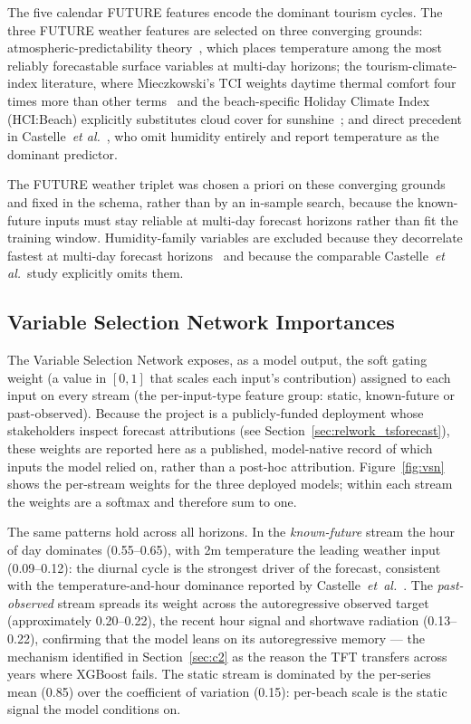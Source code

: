 \documentclass[twocolumn,twoside,a4paper,10pt]{IEEEtran}
\begin{document}
The five calendar FUTURE features encode the dominant tourism cycles. The three FUTURE weather features are selected on three converging grounds: atmospheric-predictability theory~\cite{Lorenz1963,ECMWF2024}, which places temperature among the most reliably forecastable surface variables at multi-day horizons; the tourism-climate-index literature, where Mieczkowski's TCI weights daytime thermal comfort four times more than other terms~\cite{Mieczkowski1985} and the beach-specific Holiday Climate Index (HCI:Beach) explicitly substitutes cloud cover for sunshine~\cite{ScottHCIBeach2016}; and direct precedent in Castelle~\emph{et al.}~\cite{Castelle2025}, who omit humidity entirely and report temperature as the dominant predictor.

The FUTURE weather triplet was chosen a priori on these converging grounds and fixed in the schema, rather than by an in-sample search, because the known-future inputs must stay reliable at multi-day forecast horizons rather than fit the training window. Humidity-family variables are excluded because they decorrelate fastest at multi-day forecast horizons~\cite{ECMWF2024} and because the comparable Castelle~\emph{et al.}\ study explicitly omits them.

\subsection{Variable Selection Network Importances}\label{sec:vsn}

The Variable Selection Network exposes, as a model output, the soft gating weight (a value in $[0,1]$ that scales each input's contribution) assigned to each input on every stream (the per-input-type feature group: static, known-future or past-observed). Because the project is a publicly-funded deployment whose stakeholders inspect forecast attributions (see Section~\ref{sec:relwork_tsforecast}), these weights are reported here as a published, model-native record of which inputs the model relied on, rather than a post-hoc attribution. Figure~\ref{fig:vsn} shows the per-stream weights for the three deployed models; within each stream the weights are a softmax and therefore sum to one.

The same patterns hold across all horizons. In the \emph{known-future} stream the hour of day dominates (0.55--0.65), with 2m temperature the leading weather input (0.09--0.12): the diurnal cycle is the strongest driver of the forecast, consistent with the temperature-and-hour dominance reported by Castelle~\emph{et~al.}~\cite{Castelle2025}. The \emph{past-observed} stream spreads its weight across the autoregressive observed target (approximately 0.20--0.22), the recent hour signal and shortwave radiation (0.13--0.22), confirming that the model leans on its autoregressive memory --- the mechanism identified in Section~\ref{sec:c2} as the reason the TFT transfers across years where XGBoost fails. The static stream is dominated by the per-series mean (0.85) over the coefficient of variation (0.15): per-beach scale is the static signal the model conditions on.
\end{document}
